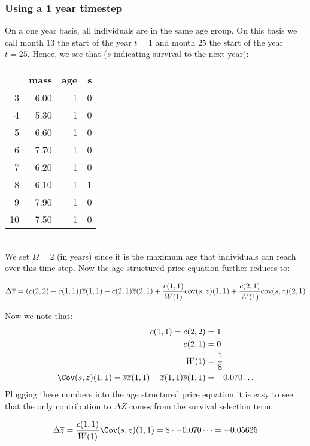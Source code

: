 \subsubsection{Using a 1 year timestep}
On a one year basis, all individuals are in the same age group. On this basis we call month $13$ the start of the year $t=1$ and month $25$ the start of the year $t=25$. Hence, we see that ($s$ indicating survival to the next year):\\
\begin{tabular}{rrrr}
  \hline
 & mass & age & s \\ 
  \hline
3 & 6.00 &   1 &   0 \\ 
  4 & 5.30 &   1 &   0 \\ 
  5 & 6.60 &   1 &   0 \\ 
  6 & 7.70 &   1 &   0 \\ 
  7 & 6.20 &   1 &   0 \\ 
  8 & 6.10 &   1 &   1 \\ 
  9 & 7.90 &   1 &   0 \\ 
  10 & 7.50 &   1 &   0 \\ 
   \hline
\end{tabular} \\
We set $\Omega=2$ (in years) since it is the maximum age that individuals can reach over this time step. Now the age structured price equation further reduces to:

\begin{equation}
\Delta \overline{z} = (c(2,2)-c(1,1))\overline{z}(1,1) - c(2,1) \overline{z}(2,1) + \frac{c(1,1)}{\overline{W}(1)} \text{cov}(s,z)(1,1) + \frac{c(2,1)}{\overline{W}(1)} \text{cov}(s,z)(2,1)
\end{equation}

Now we note that:
\begin{align*}
c(1,1) = c(2,2) & = 1\\
c(2,1) & = 0 \\
\overline{W}(1) & = \frac{1}{8} \\
\Cov(s,z)(1,1) = \overline{sz}(1,1) - \overline{z}(1,1)\overline{s}(1,1) & = -0.070\dots
\end{align*}
Plugging these numbers into the age structured price equation it is easy to see that the only contribution to $\Delta \overline{Z}$ comes from the survival selection term.

\begin{equation}
\Delta \overline{z} = \frac{c(1,1)}{\overline{W}(1)}\Cov(s,z)(1,1) = 8 \cdot -0.070\dots = -0.05625
\end{equation}

